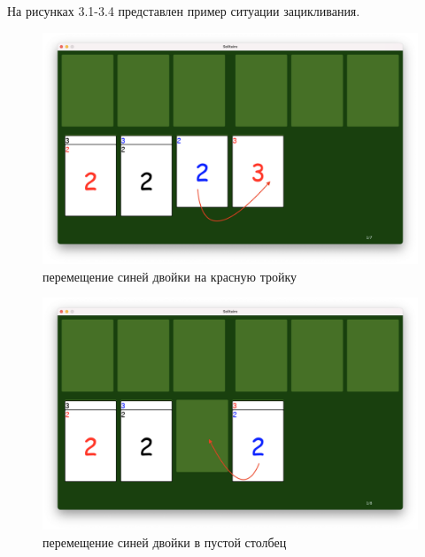 \documentclass[12pt]{report}
\begin{document}
На рисунках 3.1-3.4 представлен пример ситуации зацикливания.
\begin{figure}[H]
    	\begin{center}
    		\includegraphics[scale=0.25]{problem_1.png}
    		\caption{перемещение синей двойки на красную тройку}
    	\end{center}
\end{figure}
\begin{figure}[H]
    	\begin{center}
    		\includegraphics[scale=0.25]{problem_2.png}
    		\caption{перемещение синей двойки в пустой столбец}
    	\end{center}
\end{figure}
\end{document}

